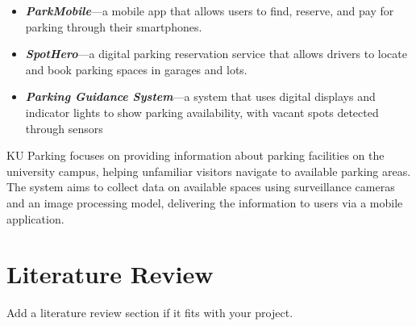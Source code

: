 \begin{itemize}
    \item \textbf{\textit{ParkMobile}}---a mobile app that allows users to find, reserve, and pay for parking through their smartphones.
    \item \textbf{\textit{SpotHero}}---a digital parking reservation service that allows drivers to locate and book parking spaces in garages and lots.
    \item \textbf{\textit{Parking Guidance System}}---a system that uses digital displays and indicator lights to show parking availability, with vacant spots detected through sensors
\end{itemize}
KU Parking focuses on providing information about parking facilities on the university campus, helping unfamiliar visitors navigate to available parking areas. The system aims to collect data on available spaces using surveillance cameras and an image processing model, delivering the information to users via a mobile application.

\section{Literature Review}
\label{section:literature-review}

Add a literature review section if it fits with your project.